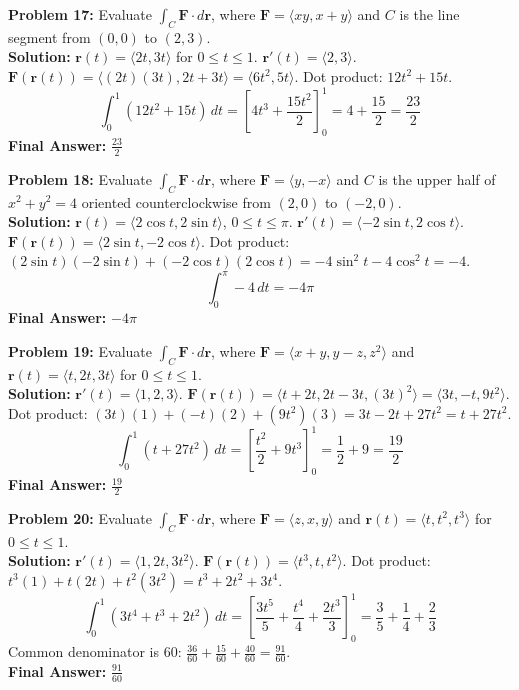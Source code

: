 \documentclass[11pt]{article}
\begin{document}
\textbf{Problem 17:} Evaluate $\int_C \mathbf{F} \cdot d\mathbf{r}$, where $\mathbf{F} = \langle xy, x+y \rangle$ and $C$ is the line segment from $(0,0)$ to $(2,3)$.
\\
\textbf{Solution:} $\mathbf{r}(t) = \langle 2t, 3t \rangle$ for $0 \le t \le 1$. $\mathbf{r}'(t) = \langle 2, 3 \rangle$.
$\mathbf{F}(\mathbf{r}(t)) = \langle (2t)(3t), 2t+3t \rangle = \langle 6t^2, 5t \rangle$.
Dot product: $12t^2 + 15t$.
$$ \int_0^1 (12t^2 + 15t) \,dt = \left[ 4t^3 + \frac{15t^2}{2} \right]_0^1 = 4 + \frac{15}{2} = \frac{23}{2} $$
\textbf{Final Answer:} $\frac{23}{2}$
\vspace{0.5cm}

\textbf{Problem 18:} Evaluate $\int_C \mathbf{F} \cdot d\mathbf{r}$, where $\mathbf{F} = \langle y, -x \rangle$ and $C$ is the upper half of $x^2 + y^2 = 4$ oriented counterclockwise from $(2,0)$ to $(-2,0)$.
\\
\textbf{Solution:} $\mathbf{r}(t) = \langle 2\cos t, 2\sin t \rangle$, $0 \le t \le \pi$.
$\mathbf{r}'(t) = \langle -2\sin t, 2\cos t \rangle$.
$\mathbf{F}(\mathbf{r}(t)) = \langle 2\sin t, -2\cos t \rangle$.
Dot product: $(2\sin t)(-2\sin t) + (-2\cos t)(2\cos t) = -4\sin^2 t - 4\cos^2 t = -4$.
$$ \int_0^\pi -4 \,dt = -4\pi $$
\textbf{Final Answer:} $-4\pi$
\vspace{0.5cm}

\textbf{Problem 19:} Evaluate $\int_C \mathbf{F} \cdot d\mathbf{r}$, where $\mathbf{F} = \langle x+y, y-z, z^2 \rangle$ and $\mathbf{r}(t) = \langle t, 2t, 3t \rangle$ for $0 \le t \le 1$.
\\
\textbf{Solution:} $\mathbf{r}'(t) = \langle 1, 2, 3 \rangle$.
$\mathbf{F}(\mathbf{r}(t)) = \langle t+2t, 2t-3t, (3t)^2 \rangle = \langle 3t, -t, 9t^2 \rangle$.
Dot product: $(3t)(1) + (-t)(2) + (9t^2)(3) = 3t - 2t + 27t^2 = t + 27t^2$.
$$ \int_0^1 (t + 27t^2) \,dt = \left[ \frac{t^2}{2} + 9t^3 \right]_0^1 = \frac{1}{2} + 9 = \frac{19}{2} $$
\textbf{Final Answer:} $\frac{19}{2}$
\vspace{0.5cm}

\textbf{Problem 20:} Evaluate $\int_C \mathbf{F} \cdot d\mathbf{r}$, where $\mathbf{F} = \langle z, x, y \rangle$ and $\mathbf{r}(t) = \langle t, t^2, t^3 \rangle$ for $0 \le t \le 1$.
\\
\textbf{Solution:} $\mathbf{r}'(t) = \langle 1, 2t, 3t^2 \rangle$.
$\mathbf{F}(\mathbf{r}(t)) = \langle t^3, t, t^2 \rangle$.
Dot product: $t^3(1) + t(2t) + t^2(3t^2) = t^3 + 2t^2 + 3t^4$.
$$ \int_0^1 (3t^4 + t^3 + 2t^2) \,dt = \left[ \frac{3t^5}{5} + \frac{t^4}{4} + \frac{2t^3}{3} \right]_0^1 = \frac{3}{5} + \frac{1}{4} + \frac{2}{3} $$
Common denominator is 60: $\frac{36}{60} + \frac{15}{60} + \frac{40}{60} = \frac{91}{60}$.
\\
\textbf{Final Answer:} $\frac{91}{60}$
\vspace{0.5cm}
\end{document}
